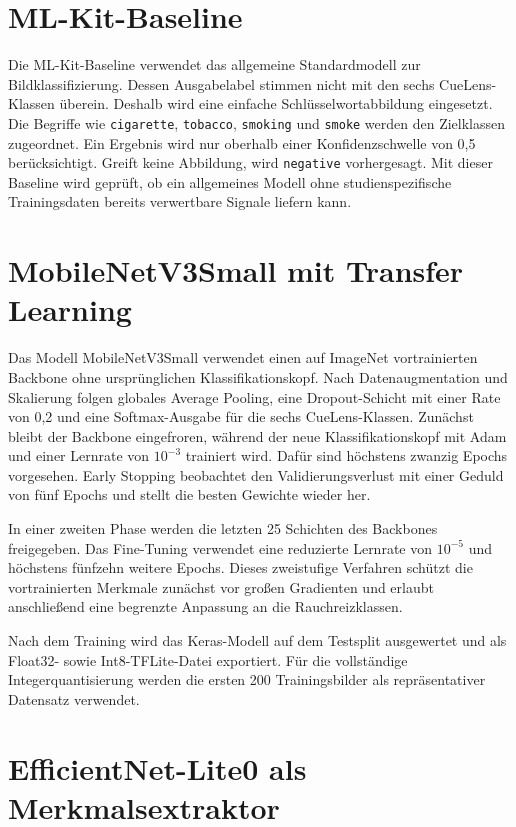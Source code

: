 \section{ML-Kit-Baseline}
Die ML-Kit-Baseline verwendet das allgemeine Standardmodell zur Bildklassifizierung. Dessen Ausgabelabel stimmen nicht mit den sechs CueLens-Klassen überein. Deshalb wird eine einfache {\linebreak}Schlüsselwortabbildung eingesetzt. Die Begriffe wie \texttt{cigarette}, \texttt{tobacco}, \texttt{smoking} und \texttt{smoke} werden den Zielklassen zugeordnet. Ein Ergebnis wird nur oberhalb einer Konfidenzschwelle von 0,5 berücksichtigt. Greift keine Abbildung, wird \texttt{negative} vorhergesagt. Mit dieser Baseline wird geprüft, ob ein allgemeines Modell ohne studienspezifische Trainingsdaten bereits verwertbare Signale liefern kann.

\section{MobileNetV3Small mit Transfer Learning}

Das Modell MobileNetV3Small verwendet einen auf ImageNet\cite{deng2009imagenet} vortrainierten Backbone ohne ursprünglichen Klassifikationskopf. Nach Datenaugmentation und Skalierung folgen globales Average Pooling, eine Dropout-Schicht mit einer Rate von 0,2 und eine Softmax-Ausgabe für die sechs CueLens-Klassen. Zunächst bleibt der Backbone eingefroren, während der neue Klassifikationskopf mit Adam und einer Lernrate von \(10^{-3}\) trainiert wird. Dafür sind höchstens zwanzig Epochs vorgesehen. Early Stopping beobachtet den Validierungsverlust mit einer Geduld von fünf Epochs und stellt die besten Gewichte wieder her.

In einer zweiten Phase werden die letzten 25 Schichten des Backbones freigegeben. Das Fine-Tuning verwendet eine reduzierte Lernrate von \(10^{-5}\) und höchstens fünfzehn weitere Epochs. Dieses zweistufige Verfahren schützt die vortrainierten Merkmale zunächst vor großen Gradienten und erlaubt anschließend eine begrenzte Anpassung an die Rauchreizklassen.

Nach dem Training wird das Keras-Modell auf dem Testsplit ausgewertet und als Float32- sowie Int8-TFLite-Datei exportiert. Für die vollständige Integerquantisierung werden die ersten 200 Trainingsbilder als repräsentativer Datensatz verwendet.

\section{EfficientNet-Lite0 als Merkmalsextraktor}

